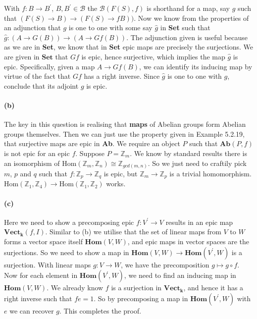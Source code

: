 \documentclass{article}
\begin{document}
With $f\colon B \rightarrow B^\prime$, $B,B^\prime \in \mathcal{B}$ the $\mathcal{B}(F(S), f)$ is shorthand for a map, say $g$ such that $(F(S) \rightarrow B) \rightarrow (F(S) \rightarrow fB))$. Now we know from the properties of an adjunction that $g$ is one to one with some say $\hat{g}$ in \textbf{Set} such that $\hat{g}\colon (A \rightarrow G(B)) \rightarrow (A \rightarrow Gf(B))$. The adjunction given is useful because as we are in \textbf{Set}, we know that in \textbf{Set} epic maps are precisely the surjections.
We are given in $\mathbf{Set}$ that $Gf$ is epic, hence surjective, which implies the map $\hat{g}$ is epic. Specifically, given a map $A \rightarrow Gf(B)$, we can identify its inducing map by virtue of the fact that $Gf$ has a right inverse. Since $\hat{g}$ is one to one with $g$, conclude that its adjoint $g$ is epic.

\paragraph{(b)}

The key in this question is realising that \textbf{maps} of Abelian groups form Abelian groups themselves. Then we can just use the property given in Example 5.2.19, that surjective maps are epic in \textbf{Ab}. We require an object $P$ such that $\mathbf{Ab}(P,f)$ is not epic for an epic $f$. Suppose $P=\mathds{Z}_m$. We know by standard results there is an isomorphism of $\text{Hom}(\mathds{Z}_m, \mathds{Z}_n) \cong \mathds{Z}_{gcd(m,n)}$. So we just need to craftily pick $m$, $p$ and $q$ such that $f\colon\mathds{Z}_p \rightarrow \mathds{Z}_q$ is epic, but $\mathds{Z}_m \rightarrow \mathds{Z}_p$ is a trivial homomorphism. $\text{Hom}(\mathds{Z}_{1},\mathds{Z}_{4}) \rightarrow \text{Hom}(\mathds{Z}_{1},\mathds{Z}_2)$ works.

\paragraph{(c)}

Here we need to show a precomposing epic $f \colon V^\prime \rightarrow V$ results in an epic map $\mathbf{Vect_k}(f, I)$.   Similar to (b) we utilise that the set of linear maps from $V$ to $W$ forms a vector space itself $\mathbf{Hom}(V,W)$, and epic maps in vector spaces are the surjections. So we need to show a map in $\textbf{Hom}(V,W) \rightarrow \mathbf{Hom}(V^\prime,W)$ is a surjection. With linear maps $g\colon V \rightarrow W$, we have the precomposition $g \mapsto g \circ f$. Now for each element in $\mathbf{Hom}(V^\prime,W)$, we need to find an inducing map in $\mathbf{Hom}(V,W)$. We already know $f$ is a surjection in $\mathbf{Vect_k}$, and hence it has a right inverse such that $fe = 1$. So by precomposing a map in $\mathbf{Hom}(V^\prime,W)$ with $e$ we can recover $g$. This completes the proof.
\end{document}
